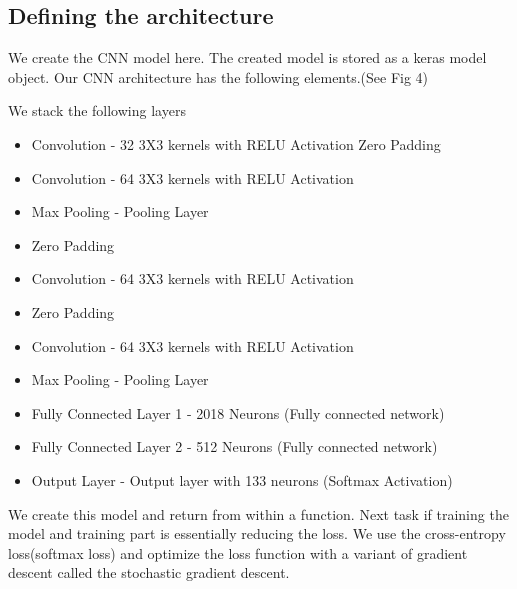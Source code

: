 \documentclass[12pt]{report}
\begin{document}
\clearpage
\subsection*{Defining the architecture}
 We create the CNN model here. The created model is stored as a keras model object. Our CNN architecture has the following elements.(See Fig 4)

We stack the following layers 
\begin{itemize}
\item Convolution  - 32 3X3 kernels with RELU Activation
Zero Padding	
\item Convolution -  64 3X3 kernels with RELU Activation
\item Max Pooling - Pooling Layer 
\item Zero Padding

\item Convolution - 64 3X3 kernels with RELU Activation
\item Zero Padding
\item Convolution - 64 3X3 kernels with RELU Activation
\item Max Pooling - Pooling Layer 

\item Fully Connected Layer 1 - 2018 Neurons (Fully connected network)
\item Fully Connected Layer 2 - 512 Neurons (Fully connected network)

\item Output Layer - Output layer with 133 neurons (Softmax Activation) 
\end{itemize}
We create this model and return from within a function. Next task if training the model and training part is essentially reducing the loss. We use the cross-entropy loss(softmax loss) and optimize the loss function with a variant of gradient descent called the stochastic gradient descent. 
\end{document}
